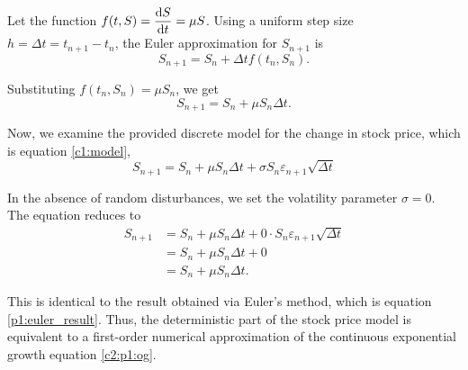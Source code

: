 Let the function $f(t, S) = \displaystyle \dv{S}{t} = \mu S$. Using a uniform step size $h = \Delta t = t_{n+1} - t_n$, the Euler approximation for $S_{n+1}$ is
\begin{equation*}
	S_{n+1} = S_n + \Delta t f(t_n, S_n).
\end{equation*}

Substituting $f(t_n, S_n) = \mu S_n$, we get
\begin{equation}
	S_{n+1} = S_n + \mu S_n \Delta t.
	\label{p1:euler_result}
\end{equation}

Now, we examine the provided discrete model for the change in stock price, which is equation \eqref{c1:model},
\begin{equation*}
	S_{n+1} = S_n + \mu S_n \Delta t + \sigma S_n \varepsilon_{n+1} \sqrt{\Delta t}
\end{equation*}

In the absence of random disturbances, we set the volatility parameter $\sigma = 0$. The equation reduces to
\begin{align*}
	S_{n+1} &= S_n + \mu S_n \Delta t + 0 \cdot S_n \varepsilon_{n+1} \sqrt{\Delta t} \\
	&= S_n + \mu S_n \Delta t + 0 \\
	&= S_n + \mu S_n \Delta t.
\end{align*}

This is identical to the result obtained via Euler's method, which is equation \eqref{p1:euler_result}. Thus, the deterministic part of the stock price model is equivalent to a first-order numerical approximation of the continuous exponential growth equation \eqref{c2:p1:og}.